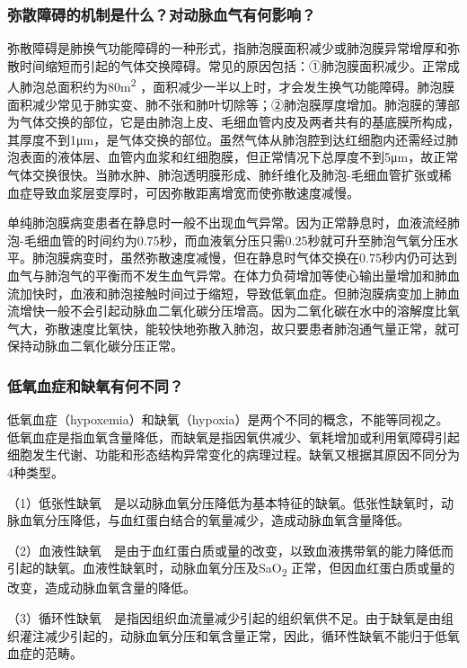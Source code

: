 \subsubsection{弥散障碍的机制是什么？对动脉血气有何影响？}

弥散障碍是肺换气功能障碍的一种形式，指肺泡膜面积减少或肺泡膜异常增厚和弥散时间缩短而引起的气体交换障碍。常见的原因包括：①肺泡膜面积减少。正常成人肺泡总面积约为80m\textsuperscript{2}
，面积减少一半以上时，才会发生换气功能障碍。肺泡膜面积减少常见于肺实变、肺不张和肺叶切除等；②肺泡膜厚度增加。肺泡膜的薄部为气体交换的部位，它是由肺泡上皮、毛细血管内皮及两者共有的基底膜所构成，其厚度不到1μm，是气体交换的部位。虽然气体从肺泡腔到达红细胞内还需经过肺泡表面的液体层、血管内血浆和红细胞膜，但正常情况下总厚度不到5μm，故正常气体交换很快。当肺水肿、肺泡透明膜形成、肺纤维化及肺泡-毛细血管扩张或稀血症导致血浆层变厚时，可因弥散距离增宽而使弥散速度减慢。

单纯肺泡膜病变患者在静息时一般不出现血气异常。因为正常静息时，血液流经肺泡-毛细血管的时间约为0.75秒，而血液氧分压只需0.25秒就可升至肺泡气氧分压水平。肺泡膜病变时，虽然弥散速度减慢，但在静息时气体交换在0.75秒内仍可达到血气与肺泡气的平衡而不发生血气异常。在体力负荷增加等使心输出量增加和肺血流加快时，血液和肺泡接触时间过于缩短，导致低氧血症。但肺泡膜病变加上肺血流增快一般不会引起动脉血二氧化碳分压增高。因为二氧化碳在水中的溶解度比氧气大，弥散速度比氧快，能较快地弥散入肺泡，故只要患者肺泡通气量正常，就可保持动脉血二氧化碳分压正常。

\subsubsection{低氧血症和缺氧有何不同？}

低氧血症（hypoxemia）和缺氧（hypoxia）是两个不同的概念，不能等同视之。低氧血症是指血氧含量降低，而缺氧是指因氧供减少、氧耗增加或利用氧障碍引起细胞发生代谢、功能和形态结构异常变化的病理过程。缺氧又根据其原因不同分为4种类型。

（1）低张性缺氧　是以动脉血氧分压降低为基本特征的缺氧。低张性缺氧时，动脉血氧分压降低，与血红蛋白结合的氧量减少，造成动脉血氧含量降低。

（2）血液性缺氧　是由于血红蛋白质或量的改变，以致血液携带氧的能力降低而引起的缺氧。血液性缺氧时，动脉血氧分压及SaO\textsubscript{2}
正常，但因血红蛋白质或量的改变，造成动脉血氧含量的降低。

（3）循环性缺氧　是指因组织血流量减少引起的组织氧供不足。由于缺氧是由组织灌注减少引起的，动脉血氧分压和氧含量正常，因此，循环性缺氧不能归于低氧血症的范畴。


